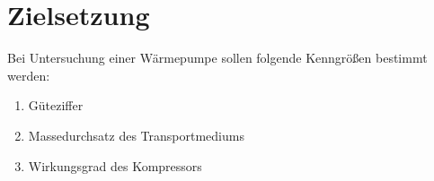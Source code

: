 \section{Zielsetzung}
\label{sec:Zielsetzung}


Bei Untersuchung einer Wärmepumpe sollen folgende Kenngrößen bestimmt werden:
\begin{enumerate}
    \item Güteziffer
    \item Massedurchsatz des Transportmediums
    \item Wirkungsgrad des Kompressors
\end{enumerate}